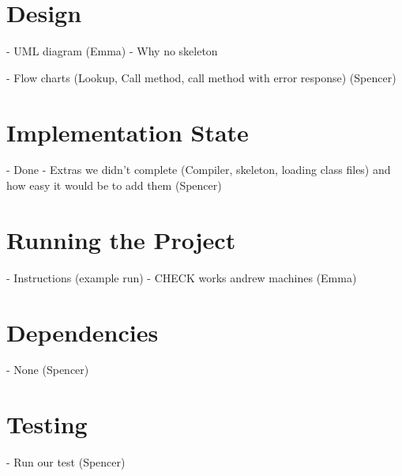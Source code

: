 \documentclass[12pt]{article}
\begin{document}
\maketitle


\section{Design}

- UML diagram (Emma)
- Why no skeleton

- Flow charts (Lookup, Call method, call method with error response) (Spencer)


\section{Implementation State}

- Done
- Extras we didn't complete (Compiler, skeleton, loading class files) and how easy it would be to add them
(Spencer)


\section{Running the Project}

- Instructions (example run)
- CHECK works andrew machines
(Emma)


\section{Dependencies}

- None
(Spencer)


\section{Testing}

- Run our test
(Spencer)
\end{document}
